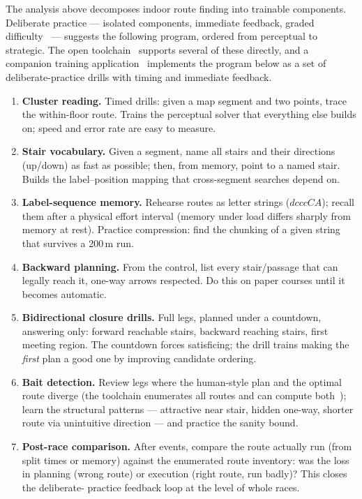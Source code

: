 \documentclass[11pt,a4paper,twocolumn]{article}
\begin{document}
The analysis above decomposes indoor route finding into trainable components.
Deliberate practice --- isolated components, immediate feedback, graded
difficulty~\cite{ericsson1993} --- suggests the following program, ordered
from perceptual to strategic. The open toolchain~\cite{repo} supports several
of these directly, and a companion training application~\cite{training-app}
implements the program below as a set of deliberate-practice drills with
timing and immediate feedback.

\begin{enumerate}
    \item \textbf{Cluster reading.} Timed drills: given a map segment and two
          points, trace the within-floor route. Trains the perceptual solver
          that everything else builds on; speed and error rate are easy to
          measure.
    \item \textbf{Stair vocabulary.} Given a segment, name all stairs and
          their directions (up/down) as fast as possible; then, from memory,
          point to a named stair. Builds the label--position mapping that
          cross-segment searches depend on.
    \item \textbf{Label-sequence memory.} Rehearse routes as letter strings
          ($dcccCA$); recall them after a physical effort interval (memory
          under load differs sharply from memory at rest). Practice
          compression: find the chunking of a given string that survives a
          200\,m run.
    \item \textbf{Backward planning.} From the control, list every
          stair/passage that can legally reach it, one-way arrows respected.
          Do this on paper courses until it becomes automatic.
    \item \textbf{Bidirectional closure drills.} Full legs, planned under a
          countdown, answering only: forward reachable stairs, backward
          reaching stairs, first meeting region. The countdown forces
          satisficing; the drill trains making the \emph{first} plan a good
          one by improving candidate ordering.
    \item \textbf{Bait detection.} Review legs where the human-style plan and
          the optimal route diverge (the toolchain enumerates all routes and
          can compute both~\cite{repo}); learn the structural patterns ---
          attractive near stair, hidden one-way, shorter route via
          unintuitive direction --- and practice the sanity bound.
    \item \textbf{Post-race comparison.} After events, compare the route
          actually run (from split times or memory) against the enumerated
          route inventory: was the loss in planning (wrong route) or
          execution (right route, run badly)? This closes the deliberate-%
          practice feedback loop at the level of whole races.
\end{enumerate}
\end{document}
